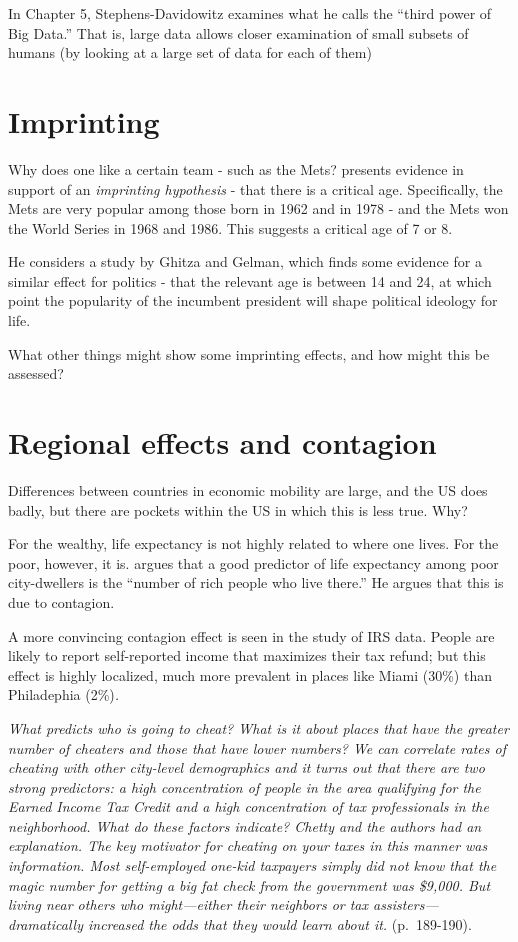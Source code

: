\documentclass[]{book}
\theoremstyle{definition}
\theoremstyle{definition}
\theoremstyle{definition}
\theoremstyle{remark}
\begin{document}
In Chapter 5, Stephens-Davidowitz examines what he calls the ``third
power of Big Data.'' That is, large data allows closer examination of
small subsets of humans (by looking at a large set of data for each of
them)

\section{Imprinting}\label{imprinting}

Why does one like a certain team - such as the Mets?
\citet{stephens2017everybody} presents evidence in support of an
\emph{imprinting hypothesis} - that there is a critical age.
Specifically, the Mets are very popular among those born in 1962 and in
1978 - and the Mets won the World Series in 1968 and 1986. This suggests
a critical age of 7 or 8.

He considers a study by Ghitza and Gelman, which finds some evidence for
a similar effect for politics - that the relevant age is between 14 and
24, at which point the popularity of the incumbent president will shape
political ideology for life.

What other things might show some imprinting effects, and how might this
be assessed?

\section{Regional effects and
contagion}\label{regional-effects-and-contagion}

Differences between countries in economic mobility are large, and the US
does badly, but there are pockets within the US in which this is less
true. Why?

For the wealthy, life expectancy is not highly related to where one
lives. For the poor, however, it is. \citet{stephens2017everybody}
argues that a good predictor of life expectancy among poor city-dwellers
is the ``number of rich people who live there.'' He argues that this is
due to contagion.

A more convincing contagion effect is seen in the study of IRS data.
People are likely to report self-reported income that maximizes their
tax refund; but this effect is highly localized, much more prevalent in
places like Miami (30\%) than Philadephia (2\%)\emph{.}

\emph{What predicts who is going to cheat? What is it about places that
have the greater number of cheaters and those that have lower numbers?
We can correlate rates of cheating with other city-level demographics
and it turns out that there are two strong predictors: a high
concentration of people in the area qualifying for the Earned Income Tax
Credit and a high concentration of tax professionals in the
neighborhood. What do these factors indicate? Chetty and the authors had
an explanation. The key motivator for cheating on your taxes in this
manner was information. Most self-employed one-kid taxpayers simply did
not know that the magic number for getting a big fat check from the
government was \$9,000. But living near others who might---either their
neighbors or tax assisters---dramatically increased the odds that they
would learn about it.} (p.~189-190).
\end{document}

